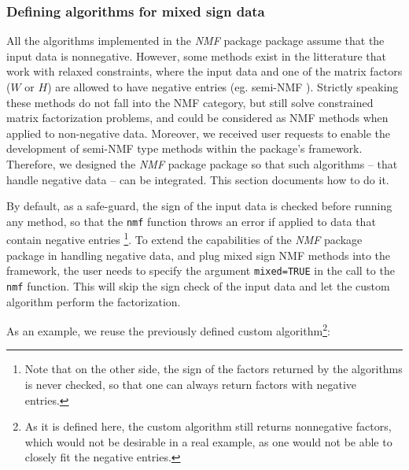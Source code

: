 \documentclass[a4paper]{article}\usepackage[]{graphicx}\usepackage[]{color}
\let\code=\texttt
\newcommand{\pkgname}[1]{\textit{#1}\xspace}
\newcommand{\Rpkg}[1]{\pkgname{#1} package\xspace}
\newcommand{\nmfpack}{\Rpkg{NMF}}
\renewcommand{\cite}[1]{\parencite{#1}}
\begin{document}
\subsubsection{Defining algorithms for mixed sign data}
All the algorithms implemented in the \nmfpack package assume that the input data is nonnegative.
However, some methods exist in the litterature that work with relaxed constraints, where the input data and one of the matrix factors ($W$ or $H$) are allowed to have negative entries (eg. semi-NMF \cite{Ding2010, Roux2008}).
Strictly speaking these methods do not fall into the NMF category, but still solve constrained matrix factorization problems, and could be considered as NMF methods when applied to non-negative data.
Moreover, we received user requests to enable the development of semi-NMF type methods within the package's framework.
Therefore, we designed the \nmfpack package so that such algorithms -- that handle negative data -- can be integrated. This section documents how to do it.

By default, as a safe-guard, the sign of the input data is checked before running any method, so that the \code{nmf} function throws an error if applied to data that contain negative entries \footnote{Note that on the other side, the sign of the factors returned by the algorithms is never checked, so that one can always return factors with negative entries.}.
To extend the capabilities of the \nmfpack package in handling negative data, and plug mixed sign NMF methods into the framework, the user needs to specify the argument \code{mixed=TRUE} in the call to the \code{nmf} function.
This will skip the sign check of the input data and let the custom algorithm perform the factorization.
 
As an example, we reuse the previously defined custom algorithm\footnote{As it is defined here, the custom algorithm still returns nonnegative factors, which would not be desirable in a real example, as one would not be able to closely fit the negative entries.}:
\end{document}
